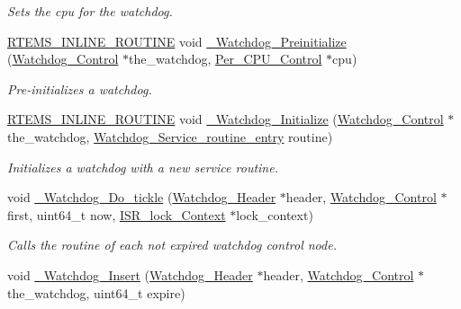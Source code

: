 \begin{DoxyCompactItemize}
\begin{DoxyCompactList}\small\item\em Sets the cpu for the watchdog. \end{DoxyCompactList}\item 
\mbox{\hyperlink{group__RTEMSScoreBaseDefs_gac216239df231d5dbd15e3520b0b9313f}{R\+T\+E\+M\+S\+\_\+\+I\+N\+L\+I\+N\+E\+\_\+\+R\+O\+U\+T\+I\+NE}} void \mbox{\hyperlink{group__RTEMSScoreWatchdog_gad98da837d665c764654ed6bcc25131dc}{\+\_\+\+Watchdog\+\_\+\+Preinitialize}} (\mbox{\hyperlink{structWatchdog__Control}{Watchdog\+\_\+\+Control}} $\ast$the\+\_\+watchdog, \mbox{\hyperlink{structPer__CPU__Control}{Per\+\_\+\+C\+P\+U\+\_\+\+Control}} $\ast$cpu)
\begin{DoxyCompactList}\small\item\em Pre-\/initializes a watchdog. \end{DoxyCompactList}\item 
\mbox{\hyperlink{group__RTEMSScoreBaseDefs_gac216239df231d5dbd15e3520b0b9313f}{R\+T\+E\+M\+S\+\_\+\+I\+N\+L\+I\+N\+E\+\_\+\+R\+O\+U\+T\+I\+NE}} void \mbox{\hyperlink{group__RTEMSScoreWatchdog_ga2e0fd021f09a108dde3bd2a2eb0d1f36}{\+\_\+\+Watchdog\+\_\+\+Initialize}} (\mbox{\hyperlink{structWatchdog__Control}{Watchdog\+\_\+\+Control}} $\ast$the\+\_\+watchdog, \mbox{\hyperlink{group__RTEMSScoreWatchdog_ga6ae5e52f6c4046535272c18a8cba66e1}{Watchdog\+\_\+\+Service\+\_\+routine\+\_\+entry}} routine)
\begin{DoxyCompactList}\small\item\em Initializes a watchdog with a new service routine. \end{DoxyCompactList}\item 
void \mbox{\hyperlink{group__RTEMSScoreWatchdog_gacedccfddf8d0838750b6272389b7aa86}{\+\_\+\+Watchdog\+\_\+\+Do\+\_\+tickle}} (\mbox{\hyperlink{structWatchdog__Header}{Watchdog\+\_\+\+Header}} $\ast$header, \mbox{\hyperlink{structWatchdog__Control}{Watchdog\+\_\+\+Control}} $\ast$first, uint64\+\_\+t now, \mbox{\hyperlink{structISR__lock__Context}{I\+S\+R\+\_\+lock\+\_\+\+Context}} $\ast$lock\+\_\+context)
\begin{DoxyCompactList}\small\item\em Calls the routine of each not expired watchdog control node. \end{DoxyCompactList}\item 
void \mbox{\hyperlink{group__RTEMSScoreWatchdog_ga3d2b8b14bed98369e12eec84c623c214}{\+\_\+\+Watchdog\+\_\+\+Insert}} (\mbox{\hyperlink{structWatchdog__Header}{Watchdog\+\_\+\+Header}} $\ast$header, \mbox{\hyperlink{structWatchdog__Control}{Watchdog\+\_\+\+Control}} $\ast$the\+\_\+watchdog, uint64\+\_\+t expire)

\end{DoxyCompactItemize}
